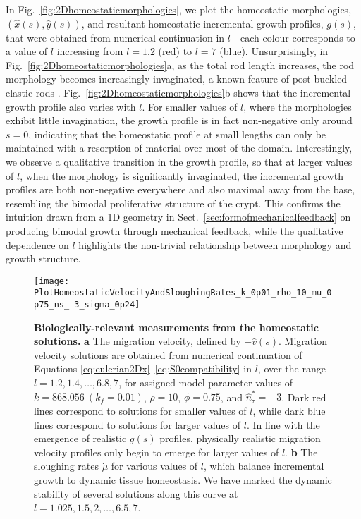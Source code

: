 In Fig.\ \ref{fig:2Dhomeostaticmorphologies}, we plot the homeostatic morphologies, $(\hat{x}(s), \hat{y}(s))$, and resultant homeostatic incremental growth profiles, $g(s)$, that were obtained from numerical continuation in $l$---each colour corresponds to a value of $l$ increasing from $l=1.2$ (red) to $l=7$ (blue). Unsurprisingly, in Fig.\ \ref{fig:2Dhomeostaticmorphologies}a, as the total rod length increases, the rod morphology becomes increasingly invaginated, a known feature of post-buckled elastic rods \cite{Edwards2007, Nelson2011, Almet2019, Chirat2013}.  Fig.\ \ref{fig:2Dhomeostaticmorphologies}b shows that the incremental growth profile also varies with $l$. For smaller values of $l$, where the morphologies exhibit little invagination, the growth profile is in fact non-negative only around $s = 0$, indicating that the homeostatic profile at small lengths can only be maintained with a resorption of material over most of the domain. Interestingly, we observe a qualitative transition in the growth profile, so that at larger values of $l$, when the morphology is significantly invaginated, the incremental growth profiles are both non-negative everywhere and also maximal away from the base, resembling the bimodal proliferative structure of the crypt. This confirms the intuition drawn from a 1D geometry in Sect.\ \ref{sec:formofmechanicalfeedback} on producing bimodal growth through mechanical feedback, while the qualitative dependence on $l$ highlights the non-trivial relationship between morphology and growth structure. 
\begin{figure*}[t!]
	\centering
	\texttt{[image: PlotHomeostaticVelocityAndSloughingRates\_k\_0p01\_rho\_10\_mu\_0p75\_ns\_-3\_sigma\_0p24]}
	\caption{\textbf{Biologically-relevant measurements from the homeostatic solutions.} \textbf{a} The migration velocity, defined by $-\hat{v}(s)$. Migration velocity solutions are obtained from numerical continuation of Equations \eqref{eq:eulerian2Dx}--\eqref{eq:S0compatibility} in $l$, over the range $l = 1.2, 1.4, \dots, 6.8, 7$, for assigned model parameter values of $k = 868.056\ (k_f = 0.01)$, $\rho = 10$, $\phi = 0.75$, and $\hat{n}_\tau^* = -3$. Dark red lines correspond to solutions for smaller values of $l$, while dark blue lines correspond to solutions for larger values of $l$. In line with the emergence of realistic $g(s)$ profiles, physically realistic migration velocity profiles only begin to emerge for larger values of $l$. \textbf{b} The sloughing rates $\dot{\mu}$ for various values of $l$, which balance incremental growth to dynamic tissue homeostasis. We have marked the dynamic stability of several solutions along this curve at $l = 1.025, 1.5, 2, \dots, 6.5, 7$.}
	\label{fig:2Dhomeostaticmeasurements}
\end{figure*}

